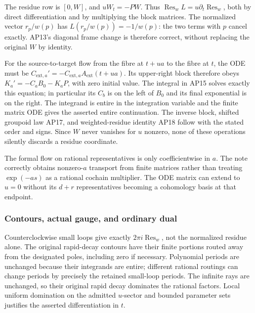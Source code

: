 The residue row is \([0,W]\), and \(u W_t=-P W\). Thus \(\operatorname{Res}_w L=u\partial_t\operatorname{Res}_w\), both by direct differentiation and by multiplying the block matrices. The normalized vector \(r_p/w(p)\) has \(L(r_p/w(p))=-1/w(p)\): the two terms with \(p\) cancel exactly. AP13's diagonal frame change is therefore correct, without replacing the original \(W\) by identity.

For the source-to-target flow from the fibre at \(t+ua\) to the fibre at \(t\), the ODE must be \(C_{\mathrm{ext},a}'=-C_{\mathrm{ext},a}A_{\mathrm{ext}}(t+ua)\). Its upper-right block therefore obeys \(K_a'=-C_a B_0-K_a P\), with zero initial value. The integral in AP15 solves exactly this equation; in particular its \(C_b\) is on the left of \(B_0\) and its final exponential is on the right. The integrand is entire in the integration variable and the finite matrix ODE gives the asserted entire continuation. The inverse block, shifted groupoid law AP17, and weighted-residue identity AP18 follow with the stated order and signs. Since \(W\) never vanishes for \(u\) nonzero, none of these operations silently discards a residue coordinate.

The formal flow on rational representatives is only coefficientwise in \(a\). The note correctly obtains nonzero-\(a\) transport from finite matrices rather than treating \(\exp(-as)\) as a rational cochain multiplier. The ODE matrix can extend to \(u=0\) without its \(d+r\) representatives becoming a cohomology basis at that endpoint.

\subsubsection{Contours, actual gauge, and ordinary dual}\label{endpoint-analytic_pole_review--contours-actual-gauge-and-ordinary-dual}

Counterclockwise small loops give exactly \(2\pi i\operatorname{Res}_w\), not the normalized residue alone. The original rapid-decay contours have their finite portions routed away from the designated poles, including zero if necessary. Polynomial periods are unchanged because their integrands are entire; different rational routings can change periods by precisely the retained small-loop periods. The infinite rays are unchanged, so their original rapid decay dominates the rational factors. Local uniform domination on the admitted \(u\)-sector and bounded parameter sets justifies the asserted differentiation in \(t\).

